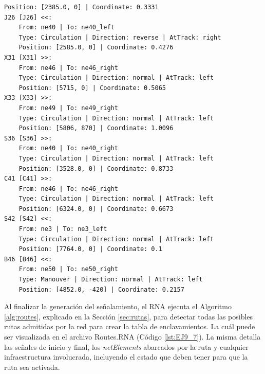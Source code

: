 \begin{lstlisting}[language = {}, caption = Signalling.RNA, label = {lst:EJ9_6}]
	Position: [2385.0, 0] | Coordinate: 0.3331
J26 [J26] <<:
	From: ne40 | To: ne40_left
	Type: Circulation | Direction: reverse | AtTrack: right 
	Position: [2585.0, 0] | Coordinate: 0.4276
X31 [X31] >>:
	From: ne46 | To: ne46_right
	Type: Circulation | Direction: normal | AtTrack: left 
	Position: [5715, 0] | Coordinate: 0.5065
X33 [X33] >>:
	From: ne49 | To: ne49_right
	Type: Circulation | Direction: normal | AtTrack: left 
	Position: [5806, 870] | Coordinate: 1.0096
S36 [S36] >>:
	From: ne40 | To: ne40_right
	Type: Circulation | Direction: normal | AtTrack: left 
	Position: [3528.0, 0] | Coordinate: 0.8733
C41 [C41] >>:
	From: ne46 | To: ne46_right
	Type: Circulation | Direction: normal | AtTrack: left 
	Position: [6324.0, 0] | Coordinate: 0.6673
S42 [S42] <<:
	From: ne3 | To: ne3_left
	Type: Circulation | Direction: normal | AtTrack: left 
	Position: [7764.0, 0] | Coordinate: 0.1
B46 [B46] <<:
	From: ne50 | To: ne50_right
	Type: Manouver | Direction: normal | AtTrack: left 
	Position: [4852.0, -420] | Coordinate: 0.2157
	\end{lstlisting}
	
	Al finalizar la generación del señalamiento, el RNA ejecuta el Algoritmo \ref{alg:routes}, explicado en la Sección \ref{sec:rutas}, para detectar todas las posibles rutas admitidas por la red para crear la tabla de enclavamientos. La cuál puede ser visualizada en el archivo Routes.RNA (Código \ref{lst:EJ9_7}). La misma detalla las señales de inicio y final, los \textit{netElements} abarcados por la ruta y cualquier infraestructura involucrada, incluyendo el estado que deben tener para que la ruta sea activada.
	
